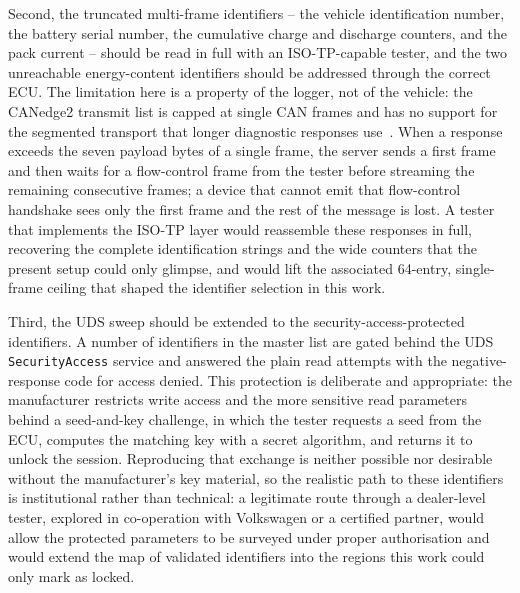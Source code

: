 \documentclass[11pt,a4paper,oneside,parskip=half]{scrreprt}
\begin{document}
Second, the truncated multi-frame identifiers -- the vehicle identification number, the battery serial number, the cumulative charge and discharge counters, and the pack current -- should be read in full with an ISO-TP-capable tester, and the two unreachable energy-content identifiers should be addressed through the correct ECU. The limitation here is a property of the logger, not of the vehicle: the CANedge2 transmit list is capped at single CAN frames and has no support for the segmented transport that longer diagnostic responses use~\cite{iso15765}. When a response exceeds the seven payload bytes of a single frame, the server sends a first frame and then waits for a flow-control frame from the tester before streaming the remaining consecutive frames; a device that cannot emit that flow-control handshake sees only the first frame and the rest of the message is lost. A tester that implements the ISO-TP layer would reassemble these responses in full, recovering the complete identification strings and the wide counters that the present setup could only glimpse, and would lift the associated 64-entry, single-frame ceiling that shaped the identifier selection in this work.

Third, the UDS sweep should be extended to the security-access-protected identifiers. A number of identifiers in the master list are gated behind the UDS \texttt{SecurityAccess} service and answered the plain read attempts with the negative-response code for access denied. This protection is deliberate and appropriate: the manufacturer restricts write access and the more sensitive read parameters behind a seed-and-key challenge, in which the tester requests a seed from the ECU, computes the matching key with a secret algorithm, and returns it to unlock the session. Reproducing that exchange is neither possible nor desirable without the manufacturer's key material, so the realistic path to these identifiers is institutional rather than technical: a legitimate route through a dealer-level tester, explored in co-operation with Volkswagen or a certified partner, would allow the protected parameters to be surveyed under proper authorisation and would extend the map of validated identifiers into the regions this work could only mark as locked.
\end{document}
